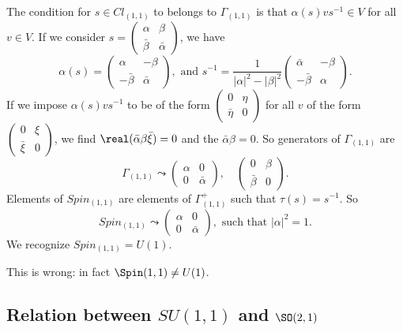 The condition for $s\in Cl_{(1,1)}$ to belongs to $\Gamma_{(1,1)}$ is that $\alpha(s)v s^{-1}\in V$ for all $v\in V$. If we consider $s=
\begin{pmatrix}
\alpha&\beta\\\bar\beta&\bar\alpha
\end{pmatrix}$,
we have
\[ 
  \alpha(s)=
\begin{pmatrix}
\alpha&-\beta\\-\bar\beta&\bar\alpha
\end{pmatrix},
\text{ and }
s^{-1}=\frac{1}{ | \alpha |^2-| \beta |^2 }
\begin{pmatrix}
\bar\alpha&-\beta\\-\bar\beta&\alpha
\end{pmatrix}.
\]
If we impose $\alpha(s)v s^{-1}$ to be of the form $\begin{pmatrix}
0&\eta\\\bar\eta&0
\end{pmatrix}$ for all $v$ of the form $\begin{pmatrix}
0&\xi\\\bar\xi&0
\end{pmatrix}$, we find $\real(\bar\alpha\beta\bar\xi)=0$ and the $\bar\alpha\beta=0$. So generators of $\Gamma_{(1,1)}$ are
\begin{equation}
\Gamma_{(1,1)}\leadsto
\begin{pmatrix}
\alpha&0\\0&\bar\alpha
\end{pmatrix},\quad
\begin{pmatrix}
0&\beta\\\bar\beta&0
\end{pmatrix}.
\end{equation}
Elements of $Spin_{(1,1)}$ are elements of $\Gamma_{(1,1)}^+$ such that $\tau(s)=s^{-1}$. So
\begin{equation}
Spin_{(1,1)}\leadsto
\begin{pmatrix}
\alpha&0\\0&\bar\alpha
\end{pmatrix},\text{ such that }| \alpha |^2=1.
\end{equation}
We recognize $Spin_{(1,1)}=U(1)$.

\begin{probleme}
This is wrong: in fact $\Spin(1,1)\neq U(1)$.
\end{probleme}

\subsection{Relation between \texorpdfstring{$SU(1,1)$}{SU(1,1)} and \texorpdfstring{$\SO(2,1)$}{SO(2,1)}}

